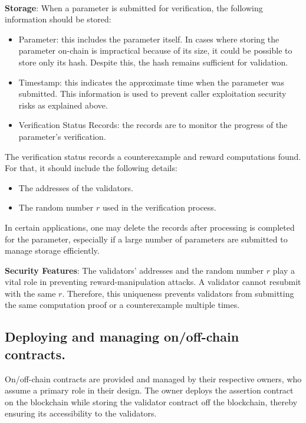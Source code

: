 \documentclass[runningheads]{llncs}
\begin{document}
\\ \textbf{Storage}:
When a parameter is submitted for verification, the following information should be stored:
\begin{itemize}
\item Parameter: this includes the parameter itself. In cases where storing the parameter on-chain is impractical because of its size, it could be possible to store only its hash. Despite this, the hash remains sufficient for validation.
\item Timestamp: this indicates the approximate time when the parameter was submitted. This information is used to prevent caller exploitation security risks as explained above.
\item Verification Status Records: the records are to monitor the progress of the parameter's verification.
\end{itemize}

The verification status records a counterexample and reward computations found. For that, it should include the following details:
\begin{itemize}
    \item The addresses of the validators.
    \item The random number $r$ used in the verification process.
\end{itemize}


In certain applications, one may delete the records after processing is completed for the parameter, especially if a large number of parameters are submitted to manage storage efficiently.

\textbf{Security Features}:
The validators' addresses and the random number $r$ play a vital role in preventing reward-manipulation attacks. A validator cannot resubmit with the same $r$. Therefore, this uniqueness prevents validators from submitting the same computation proof or a counterexample multiple times.
\subsection{Deploying and managing on/off-chain contracts.}
On/off-chain contracts are provided and managed by their respective owners, who assume a primary role in their design. The owner deploys the assertion contract on the blockchain while storing the validator contract off the blockchain, thereby ensuring its accessibility to the validators.
\end{document}
